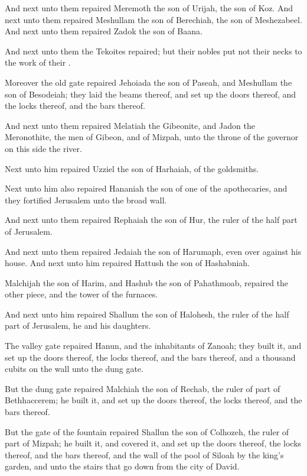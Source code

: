 \verse And next unto them repaired Meremoth the son of Urijah, the son of Koz. And next unto them repaired Meshullam the son of Berechiah, the son of Meshezabeel. And next unto them repaired Zadok the son of Baana.

\verse And next unto them the Tekoites repaired; but their nobles put not their necks to the work of their \LORD.

\verse Moreover the old gate repaired Jehoiada the son of Paseah, and Meshullam the son of Besodeiah; they laid the beams thereof, and set up the doors thereof, and the locks thereof, and the bars thereof.

\verse And next unto them repaired Melatiah the Gibeonite, and Jadon the Meronothite, the men of Gibeon, and of Mizpah, unto the throne of the governor on this side the river.

\verse Next unto him repaired Uzziel the son of Harhaiah, of the goldsmiths.

Next unto him also repaired Hananiah the son of one of the apothecaries, and they fortified Jerusalem unto the broad wall.

\verse And next unto them repaired Rephaiah the son of Hur, the ruler of the half part of Jerusalem.

\verse And next unto them repaired Jedaiah the son of Harumaph, even over against his house. And next unto him repaired Hattush the son of Hashabniah.

\verse Malchijah the son of Harim, and Hashub the son of Pahathmoab, repaired the other piece, and the tower of the furnaces.

\verse And next unto him repaired Shallum the son of Halohesh, the ruler of the half part of Jerusalem, he and his daughters.

\verse The valley gate repaired Hanun, and the inhabitants of Zanoah; they built it, and set up the doors thereof, the locks thereof, and the bars thereof, and a thousand cubits on the wall unto the dung gate.

\verse But the dung gate repaired Malchiah the son of Rechab, the ruler of part of Bethhaccerem; he built it, and set up the doors thereof, the locks thereof, and the bars thereof.

\verse But the gate of the fountain repaired Shallun the son of Colhozeh, the ruler of part of Mizpah; he built it, and covered it, and set up the doors thereof, the locks thereof, and the bars thereof, and the wall of the pool of Siloah by the king's garden, and unto the stairs that go down from the city of David.

